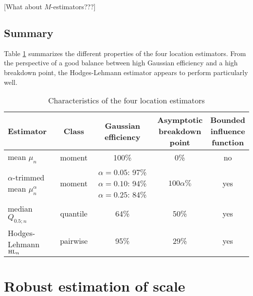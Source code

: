 \alert{[What about $M$-estimators???]}

\subsection{Summary}


Table \ref{tab:stat:location} summarizes the different properties of the four
location estimators. From the perspective of a good balance between high
Gaussian efficiency and a high breakdown point, the Hodges-Lehmann estimator
appears to perform particularly well.

\begin{table}[h!]
    \centering
    \caption{Characteristics of the four location estimators}
    \label{tab:stat:location}
    \begin{tabular}{lcccc}
        \toprule
        Estimator
        & Class  
        & \subtab{c}{Gaussian\\ efficiency}
        & \subtab{c}{Asymptotic\\ breakdown\\ point} 
        & \subtab{c}{Bounded\\ influence\\ function}
        \\\midrule
        mean $\mu_n$                            & moment   & 100\% &  0\%          & no
        \\\addlinespace
        $\alpha$-trimmed mean $\mu_n^{\alpha}$  & moment   & 
            \subtab{l}{$\alpha=0.05$: 97\%\\ $\alpha=0.10$: 94\%\\ $\alpha=0.25$: 84\%} 
                                                                   & $100\alpha\%$ & yes
        \\\addlinespace
        median $Q_{0.5;n}$                      & quantile & 64\%  & 50\%          & yes
        \\\addlinespace
        Hodges-Lehmann $\stsc{HL}_n$            & pairwise & 95\%  & 29\%          & yes
        \\\bottomrule
    \end{tabular}
\end{table}


\section{Robust estimation of scale\label{subsec:scale}}


